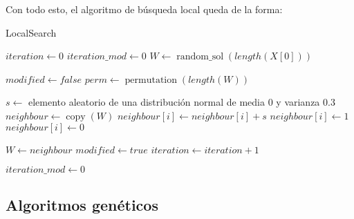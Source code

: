 \documentclass[11pt,a4paper]{article}
\begin{document}
Con todo esto, el algoritmo de búsqueda local queda de la forma: \\
\begin{algorithm}[H]
	\caption{{\sc LocalSearch}}
	
	$iteration \gets 0$ \;
	$iteration\_mod \gets 0$ \;
	$W \gets \operatorname{random\_sol}(length(X[0]))$ \;
	 {
		$modified \gets false$ \;
		$perm \gets \operatorname{permutation}(length(W))$ \;
		
		 {
			$s \gets$ elemento aleatorio de una distribución normal de media 0 y varianza 0.3 \;
			$neighbour \gets \operatorname{copy}(W)$ \;
			$neighbour[i] \gets neighbour[i] + s$ \;
			 {
				$neighbour[i] \gets 1$ \;
			}  {
				$neighbour[i] \gets 0$ \;
			}
			
			 {
				$W \gets neighbour$ \;
				$modified \gets true$ \;
			}
			$iteration \gets iteration + 1$ \;
		} 
		 {
			$iteration\_mod \gets 0$ \;
		} 
	}
	 \;
\end{algorithm}

\subsection{Algoritmos genéticos}
\end{document}

